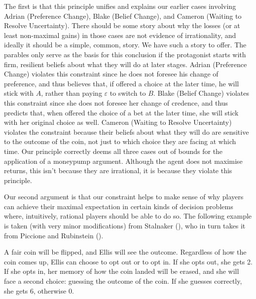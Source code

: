 \documentclass[
  11pt,
  letterpaper,
  DIV=11,
  numbers=noendperiod,
  twoside]{scrartcl}
\begin{document}
The first is that this principle unifies and explains our earlier cases
involving Adrian (Preference Change), Blake (Belief Change), and Cameron
(Waiting to Resolve Uncertainty). There should be some story about why
the losses (or at least non-maximal gains) in those cases are not
evidence of irrationality, and ideally it should be a simple, common,
story. We have such a story to offer. The parables only serve as the
basis for this conclusion if the protagonist starts with firm, resilient
beliefs about what they will do at later stages. Adrian (Preference
Change) violates this constraint since he does not foresee his change of
preference, and thus believes that, if offered a choice at the later
time, he will stick with \(A\), rather than paying \(\varepsilon\) to
switch to \(B\). Blake (Belief Change) violates this constraint since
she does not foresee her change of credence, and thus predicts that,
when offered the choice of a bet at the later time, she will stick with
her original choice as well. Cameron (Waiting to Resolve Uncertainty)
violates the constraint because their beliefs about what they will do
are sensitive to the outcome of the coin, not just to which choice they
are facing at which time. Our principle correctly deems all three cases
out of bounds for the application of a moneypump argument. Although the
agent does not maximise returns, this isn't because they are irrational,
it is because they violate this principle.

Our second argument is that our constraint helps to make sense of why
players can achieve their maximal expectation in certain kinds of
decision problems where, intuitively, rational players should be able to
do so. The following example is taken (with very minor modifications)
from Stalnaker (), who in turn takes
it from Piccione and Rubinstein
().

A fair coin will be flipped, and Ellis will see the outcome. Regardless
of how the coin comes up, Ellis can choose to opt out or to opt in. If
she opts out, she gets 2. If she opts in, her memory of how the coin
landed will be erased, and she will face a second choice: guessing the
outcome of the coin. If she guesses correctly, she gets 6, otherwise 0.
\end{document}
